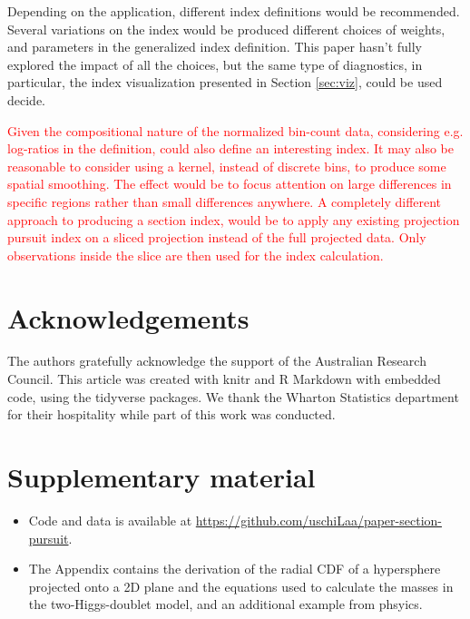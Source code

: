 \documentclass[]{interact}
\theoremstyle{plain}%
\theoremstyle{definition}
\theoremstyle{remark}
\def\tightlist{}
\begin{document}
Depending on the application, different index definitions would be
recommended. Several variations on the index would be produced different
choices of weights, and parameters in the generalized index definition.
This paper hasn't fully explored the impact of all the choices, but the
same type of diagnostics, in particular, the index visualization
presented in Section \ref{sec:viz}, could be used decide.

\textcolor{red}{Given the compositional nature of the normalized bin-count data, considering e.g. log-ratios in the definition, could also define an interesting index. It may also be reasonable to consider using a kernel, instead of discrete bins, to produce some spatial smoothing. The effect would be to focus attention on large differences in specific regions rather than small differences anywhere. A completely different approach  to producing a section index, would be to apply any existing projection pursuit index on a sliced projection instead of the full projected data. Only observations inside the slice are then used for the index calculation.}

\hypertarget{acknowledgements}{%
\section*{Acknowledgements}\label{acknowledgements}}

The authors gratefully acknowledge the support of the Australian
Research Council. This article was created with knitr \citep{knitr} and
R Markdown \citep{rmarkdown} with embedded code, using the tidyverse
\citep{tidyverse} packages. We thank the Wharton Statistics department
for their hospitality while part of this work was conducted.

\hypertarget{supplementary-material}{%
\section*{Supplementary material}\label{supplementary-material}}

\begin{itemize}
\tightlist
\item
  Code and data is available at
  \url{https://github.com/uschiLaa/paper-section-pursuit}.
\item
  The Appendix contains the derivation of the radial CDF of a
  hypersphere projected onto a 2D plane and the equations used to
  calculate the masses in the two-Higgs-doublet model, and an additional
  example from phsyics.
\end{itemize}



\end{document}
